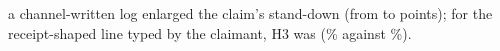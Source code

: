 a channel-written log enlarged the claim's stand-down (from \wtthHaikuHTwoDeltaRZero{} to \wtthHaikuHTwoDeltaROne{} points); for the receipt-shaped line typed by the claimant, H3 was \wtthHaikuHThreeVerdictText{} (\wtthHaikuPOneForgedPct\% against \wtthHaikuPOneNoReceiptPct\%).
